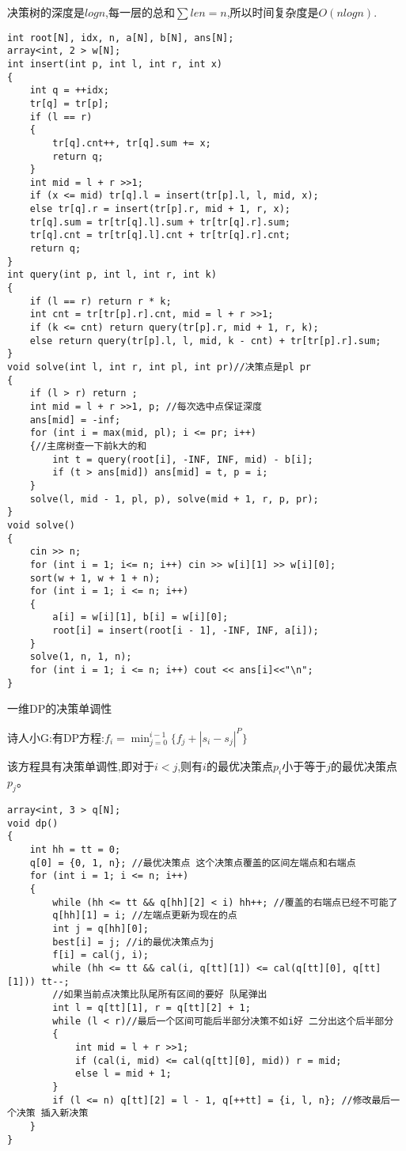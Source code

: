 \documentclass[a4paper, fontset=none]{ctexart}
\begin{document}
决策树的深度是$logn$,每一层的总和$\sum len=n$,所以时间复杂度是$O(nlogn)$.

\begin{verbatim}
int root[N], idx, n, a[N], b[N], ans[N];
array<int, 2 > w[N];
int insert(int p, int l, int r, int x)
{
    int q = ++idx;
    tr[q] = tr[p];
    if (l == r)
    {
        tr[q].cnt++, tr[q].sum += x;
        return q;
    }
    int mid = l + r >>1;
    if (x <= mid) tr[q].l = insert(tr[p].l, l, mid, x);
    else tr[q].r = insert(tr[p].r, mid + 1, r, x);
    tr[q].sum = tr[tr[q].l].sum + tr[tr[q].r].sum;
    tr[q].cnt = tr[tr[q].l].cnt + tr[tr[q].r].cnt;
    return q;
}
int query(int p, int l, int r, int k)
{
    if (l == r) return r * k;
    int cnt = tr[tr[p].r].cnt, mid = l + r >>1;
    if (k <= cnt) return query(tr[p].r, mid + 1, r, k);
    else return query(tr[p].l, l, mid, k - cnt) + tr[tr[p].r].sum;
}
void solve(int l, int r, int pl, int pr)//决策点是pl pr
{
    if (l > r) return ;
    int mid = l + r >>1, p; //每次选中点保证深度
    ans[mid] = -inf;
    for (int i = max(mid, pl); i <= pr; i++)
    {//主席树查一下前k大的和
        int t = query(root[i], -INF, INF, mid) - b[i];
        if (t > ans[mid]) ans[mid] = t, p = i;
    }
    solve(l, mid - 1, pl, p), solve(mid + 1, r, p, pr);
}
void solve()
{
    cin >> n;
    for (int i = 1; i<= n; i++) cin >> w[i][1] >> w[i][0];
    sort(w + 1, w + 1 + n);
    for (int i = 1; i <= n; i++)
    {
        a[i] = w[i][1], b[i] = w[i][0];
        root[i] = insert(root[i - 1], -INF, INF, a[i]);
    }
    solve(1, n, 1, n);
    for (int i = 1; i <= n; i++) cout << ans[i]<<"\n";
}
\end{verbatim}

一维DP的决策单调性

诗人小G:有DP方程:$f_i=\min_{j=0}^{i-1}\{f_j+|s_i-s_j|^P\}$

该方程具有决策单调性,即对于$i < j$,则有$i$的最优决策点$p_i$小于等于$j$的最优决策点$p_j$。

\begin{verbatim}
array<int, 3 > q[N];
void dp()
{
    int hh = tt = 0;
    q[0] = {0, 1, n}; //最优决策点 这个决策点覆盖的区间左端点和右端点
    for (int i = 1; i <= n; i++)
    {
        while (hh <= tt && q[hh][2] < i) hh++; //覆盖的右端点已经不可能了
        q[hh][1] = i; //左端点更新为现在的点
        int j = q[hh][0];
        best[i] = j; //i的最优决策点为j
        f[i] = cal(j, i);
        while (hh <= tt && cal(i, q[tt][1]) <= cal(q[tt][0], q[tt][1])) tt--;
        //如果当前点决策比队尾所有区间的要好 队尾弹出
        int l = q[tt][1], r = q[tt][2] + 1;
        while (l < r)//最后一个区间可能后半部分决策不如i好 二分出这个后半部分
        {
            int mid = l + r >>1;
            if (cal(i, mid) <= cal(q[tt][0], mid)) r = mid;
            else l = mid + 1;
        }
        if (l <= n) q[tt][2] = l - 1, q[++tt] = {i, l, n}; //修改最后一个决策 插入新决策
    }
}
\end{verbatim}
\end{document}
